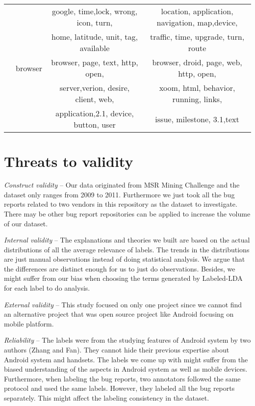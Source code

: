 \documentclass[10pt, conference, compsocconf]{IEEEtran}
\begin{document}
\begin{table*}[!htb]
\begin{tabular}{|c||c||c||c|}
&&google, time,lock, wrong, icon, turn, & location, application, navigation, map,device, \\

&&home, latitude, unit, tag, available & traffic, time, upgrade, turn, route\\ \cline{2-4}

    &browser& browser, page, text, http, open, & browser, droid, page, web, http, open, \\
    &&server,verion, desire, client, web, & xoom, html, behavior, running, links, \\
&& application,2.1, device, button, user  & issue, milestone, 3.1,text \\
\hline
\end{tabular}
\end{table*}

\section{Threats to validity}
\label{sec:threats}

\textit{Construct validity} – Our data originated from MSR Mining Challenge \cite{MSRChallenge2012} and the dataset only ranges from 2009 to 2011. Furthermore we just took all the bug reports related to two vendors in this repository as the dataset to investigate. There may be other bug report repositories can be applied to increase the volume of our dataset. 

\textit{Internal validity} – The explanations and theories we built are based on the actual distributions of all the  average relevance of labels. The trends in the distributions are just manual observations instead of doing statistical analysis. We argue that the differences are distinct enough for us to just do observations. Besides, we might suffer from our bias when choosing the terms generated by Labeled-LDA for each label to do analysis. 

\textit{External validity} – This study focused on only one project since we cannot find an alternative project that was open source project like Android focusing on mobile platform.

\textit{Reliability} – The labels were from the studying features of Android system by two authors (Zhang and Fan). They cannot hide their previous expertise about Android system and handsets. The labels we come up with might suffer from the biased understanding of the aspects in Android system as well as mobile devices. Furthermore, when labeling the bug reports, two annotators followed the same protocol and used the same labels. However, they labeled all the bug reports separately. This might affect the labeling consistency in the dataset. 
\end{document}
